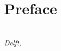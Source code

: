 \chapter*{Preface}

\begin{flushright}
{\makeatletter\itshape
    \@author \\
    Delft, \monthname{} \the\year{}
\makeatother}
\end{flushright}
